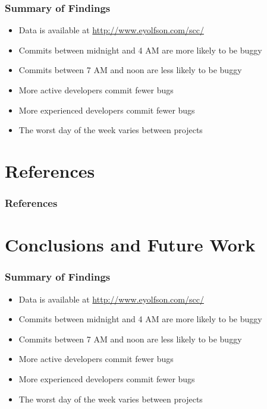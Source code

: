 \documentclass[aspectratio=43]{beamer}
\begin{document}
\begin{frame}
  \frametitle{Summary of Findings}
  
  \begin{itemize}
    \item Data is available at \url{http://www.eyolfson.com/scc/}

    \item Commits between midnight and 4 AM are more likely to be buggy

    \item Commits between 7 AM and noon are less likely to be buggy

    \item More active developers commit fewer bugs

    \item More experienced developers commit fewer bugs

    \item The worst day of the week varies between projects
  \end{itemize}
\end{frame}

\section*{References}
\begin{frame}
  \frametitle{References}
  
  
\end{frame}

\section*{Conclusions and Future Work}
\begin{frame}
  \frametitle{Summary of Findings}

  \begin{itemize}
    \item Data is available at \url{http://www.eyolfson.com/scc/}

    \item Commits between midnight and 4 AM are more likely to be buggy

    \item Commits between 7 AM and noon are less likely to be buggy

    \item More active developers commit fewer bugs

    \item More experienced developers commit fewer bugs

    \item The worst day of the week varies between projects
  \end{itemize}
\end{frame}
\end{document}
